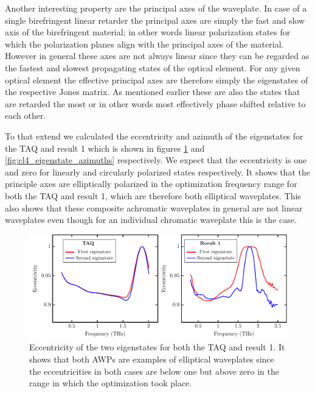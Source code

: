 Another interesting property are the principal axes of the waveplate. In case of a single birefringent linear retarder the principal axes are simply the fast and slow axis of the birefringent material; in other words linear polarization states for which the polarization planes align with the principal axes of the material. However in general these axes are not always linear since they can be regarded as the fastest and slowest propagating states of the optical element. For any given optical element the effective principal axes are therefore simply the eigenstates of the respective Jones matrix. As mentioned earlier these are also the states that are retarded the most or in other words most effectively phase shifted relative to each other. 

To that extend we calculated the eccentricity and azimuth of the eigenstates for the TAQ and result 1 which is shown in figures \ref{fig:cl4_eigenstate_eccentricity} and \ref{fig:cl4_eigenstate_azimuths} respectively. We expect that the eccentricity is one and zero for linearly and circularly polarized states respectively. It shows that the principle axes are elliptically polarized in the optimization frequency range for both the TAQ and result 1, which are therefore both elliptical waveplates. This also shows that these composite achromatic waveplates in general are not linear waveplates even though for an individual chromatic waveplate this is the case.

\begin{figure}[H]
    \centering
    \includegraphics[scale=0.75]{images/results/plots/ceramic/eigenstate_eccentricity.pdf}
    \caption{Eccentricity of the two eigenstates for both the TAQ and result 1. It shows that both AWPs are examples of elliptical waveplates since the eccentricities in both cases are below one but above zero in the range in which the optimization took place.}
    \label{fig:cl4_eigenstate_eccentricity}
\end{figure}

